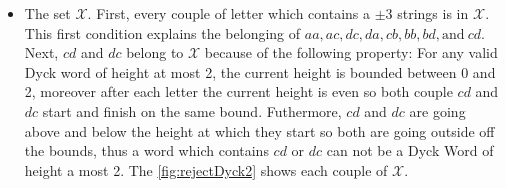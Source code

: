 \begin{tproof}
\begin{table}[htb]
        \newpage
    \end{table}
    \begin{itemize}
        \item The set $\mathcal{X}$. First, every couple of letter which contains
              a $\pm 3$ strings is in $\mathcal{X}$. This first condition explains the belonging
              of $aa, ac, dc, da, cb, bb, bd, \textrm{and}\ cd $. Next, $cd$ and $dc$ belong
              to $\mathcal{X}$ because of the following property: For any valid Dyck word of
              height at most 2, the current height is bounded between 0 and 2, moreover after each
              letter the current height is even so both couple $cd$ and $dc$ start
              and finish on the same bound. Futhermore,  $cd$ and $dc$ are going
              above and below the height at which they start so both are going outside off the
              bounds, thus a word which contains $cd$ or $dc$ can not be a Dyck Word of height a most 2.
              The \autoref{fig:rejectDyck2} shows each couple of $\mathcal{X}$.


\end{itemize}
\end{tproof}
